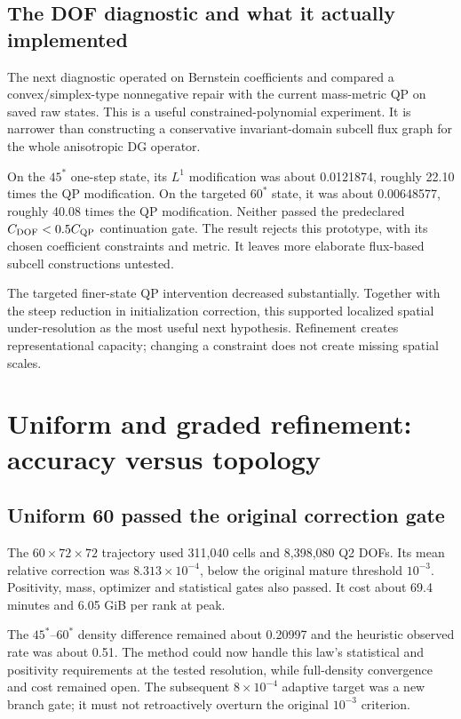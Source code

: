 \section{The DOF diagnostic and what it actually implemented}
The next diagnostic operated on Bernstein coefficients and compared a convex/simplex-type nonnegative repair with the current mass-metric QP on saved raw states. This is a useful constrained-polynomial experiment. It is narrower than constructing a conservative invariant-domain subcell flux graph for the whole anisotropic DG operator.

On the $45^*$ one-step state, its $L^1$ modification was about 0.0121874, roughly 22.10 times the QP modification. On the targeted $60^*$ state, it was about 0.00648577, roughly 40.08 times the QP modification. Neither passed the predeclared $C_{\rm DOF}<0.5C_{\rm QP}$ continuation gate. The result rejects this prototype, with its chosen coefficient constraints and metric. It leaves more elaborate flux-based subcell constructions untested.

The targeted finer-state QP intervention decreased substantially. Together with the steep reduction in initialization correction, this supported localized spatial under-resolution as the most useful next hypothesis. Refinement creates representational capacity; changing a constraint does not create missing spatial scales.

\chapter{Uniform and graded refinement: accuracy versus topology}
\section{Uniform 60 passed the original correction gate}
The $60\times72\times72$ trajectory used 311,040 cells and 8,398,080 Q2 DOFs. Its mean relative correction was $8.313\times10^{-4}$, below the original mature threshold $10^{-3}$. Positivity, mass, optimizer and statistical gates also passed. It cost about 69.4 minutes and 6.05 GiB per rank at peak.

The $45^*$--$60^*$ density difference remained about 0.20997 and the heuristic observed rate was about 0.51. The method could now handle this law's statistical and positivity requirements at the tested resolution, while full-density convergence and cost remained open. The subsequent $8\times10^{-4}$ adaptive target was a new branch gate; it must not retroactively overturn the original $10^{-3}$ criterion.


